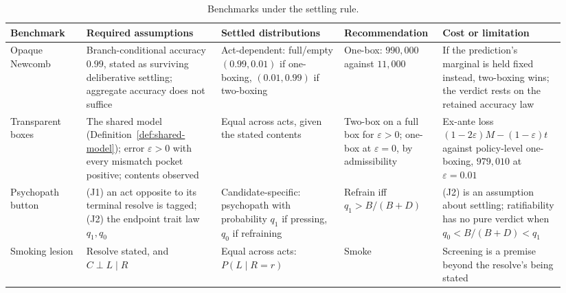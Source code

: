 \begin{table}[ht]
\centering
\footnotesize
\setlength{\tabcolsep}{3pt}
\caption{Benchmarks under the settling rule.}
\label{tab:benchmarks}
\begin{tabular}{@{}>{\raggedright\arraybackslash}p{0.13\linewidth}>{\raggedright\arraybackslash}p{0.23\linewidth}>{\raggedright\arraybackslash}p{0.21\linewidth}>{\raggedright\arraybackslash}p{0.16\linewidth}>{\raggedright\arraybackslash}p{0.21\linewidth}@{}}
\toprule
Benchmark & Required assumptions & Settled distributions & Recommendation & Cost or limitation \\
\midrule
Opaque Newcomb & Branch-conditional accuracy $0.99$, stated as surviving deliberative settling; aggregate accuracy does not suffice & Act-dependent: full/empty $(0.99, 0.01)$ if one-boxing, $(0.01, 0.99)$ if two-boxing & One-box: $990{,}000$ against $11{,}000$ & If the prediction's marginal is held fixed instead, two-boxing wins; the verdict rests on the retained accuracy law \\
Transparent boxes & The shared model (Definition~\ref{def:shared-model}); error $\varepsilon > 0$ with every mismatch pocket positive; contents observed & Equal across acts, given the stated contents & Two-box on a full box for $\varepsilon > 0$; one-box at $\varepsilon = 0$, by admissibility & Ex-ante loss $(1 - 2\varepsilon)M - (1 - \varepsilon)t$ against policy-level one-boxing, $979{,}010$ at $\varepsilon = 0.01$ \\
Psychopath button & (J1) an act opposite to its terminal resolve is tagged; (J2) the endpoint trait law $q_1, q_0$ & Candidate-specific: psychopath with probability $q_1$ if pressing, $q_0$ if refraining & Refrain iff $q_1 > B/(B + D)$ & (J2) is an assumption about settling; ratifiability has no pure verdict when $q_0 < B/(B + D) < q_1$ \\
Smoking lesion & Resolve stated, and $C \perp L \mid R$ & Equal across acts: $P(L \mid R = r)$ & Smoke & Screening is a premise beyond the resolve's being stated \\
\bottomrule
\end{tabular}
\end{table}

